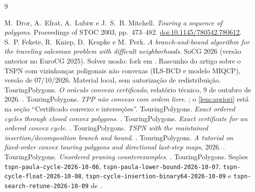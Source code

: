 \documentclass[11pt,a4paper]{article}
\theoremstyle{plain}\newtheorem{proposicao}{Proposição}
\theoremstyle{definition}\newtheorem{definicao}{Definição}
\theoremstyle{plain}\newtheorem{teorema}{Teorema}
\theoremstyle{plain}\newtheorem{lema}{Lema}
\newcommand{\code}[1]{\texttt{\small #1}}
\begin{document}
\clearpage
\begin{thebibliography}{9}\small\raggedright
{} M.~Dror, A.~Efrat, A.~Lubiw e J.~S.~B. Mitchell. \emph{Touring a sequence of polygons}. Proceedings of STOC 2003, pp.~473--482. \href{https://doi.org/10.1145/780542.780612}{doi:10.1145/780542.780612}.
 S.~P. Fekete, R.~Kniep, D.~Krupke e M.~Perk. \emph{A branch-and-bound algorithm for the traveling salesman problem with difficult neighborhoods}. SoCG 2026 (versão anterior no EuroCG 2025). Solver usado: fork em .
 Rascunho do artigo sobre o TSPN com vizinhanças poligonais não convexas (ILS-BCD e modelo MIQCP), versão de 07/10/2026. Material local, sem autorização de redistribuição.
 TouringPolygons. \emph{O oráculo convexo certificado}, relatório técnico, 9 de outubro de 2026. .
 TouringPolygons. \emph{TPP não convexo com ordem livre}. ; o \cref{lem:apriori} está na seção ``Certificado convexo e interseções''.
 TouringPolygons. \emph{Exact ordered cycles through closed convex polygons}. .
 TouringPolygons. \emph{Exact certificate for an ordered convex cycle}. .
 TouringPolygons. \emph{TSPN with the maintained insertion/decomposition branch and bound}. .
 TouringPolygons. \emph{A tutorial on fixed-order convex touring polygons and directional last-step maps}, 2026. .
 TouringPolygons. \emph{Unordered pruning counterexamples}. .
 TouringPolygons. Seções \code{tspn-paula-cycle-2026-10-06}, \code{tspn-paula-lower-bound-2026-10-07}, \code{tspn-cycle-float-2026-10-08}, \code{tspn-cycle-insertion-binary64-2026-10-09} e \code{tspn-search-retune-2026-10-09} de .
\end{thebibliography}
\end{document}
